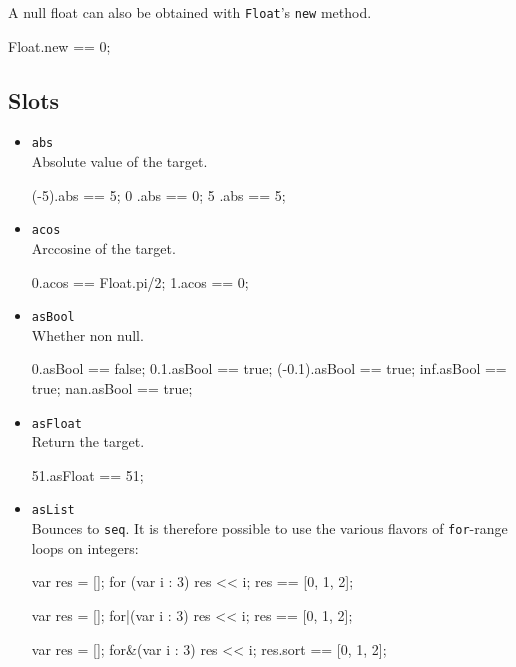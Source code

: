 A null float can also be obtained with \lstinline|Float|'s
\lstinline|new| method.

\begin{urbiassert}[firstnumber=last]
Float.new == 0;
\end{urbiassert}

\subsection{Slots}

\begin{itemize}
\item \lstinline|abs|\\
  Absolute value of the target.
\begin{urbiassert}[firstnumber=last]
(-5).abs == 5;
  0 .abs == 0;
  5 .abs == 5;
\end{urbiassert}

\item \lstinline|acos|\\
  Arccosine of the target.
\begin{urbiassert}[firstnumber=last]
0.acos == Float.pi/2;
1.acos == 0;
\end{urbiassert}

\item \lstinline|asBool|\\
  Whether non null.
\begin{urbiassert}[firstnumber=last]
0.asBool == false;
0.1.asBool == true;
(-0.1).asBool == true;
inf.asBool == true;
nan.asBool == true;
\end{urbiassert}

\item \lstinline|asFloat|\\
  Return the target.
\begin{urbiassert}[firstnumber=last]
51.asFloat == 51;
\end{urbiassert}

\item \lstinline|asList|\\
  Bounces to \lstinline|seq|.  It is therefore possible to use the
  various flavors of \lstinline|for|-range loops on integers:
\begin{urbiassert}[firstnumber=last]
{
  var res = [];
  for (var i : 3)
    res << i;
  res
}
== [0, 1, 2];

{
  var res = [];
  for|(var i : 3)
    res << i;
  res
}
== [0, 1, 2];

{
  var res = [];
  for&(var i : 3)
    res << i;
  res.sort
}
== [0, 1, 2];
\end{urbiassert}%


\end{itemize}
